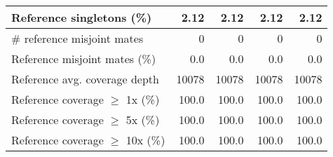 \documentclass[12pt,a4paper]{article}
\begin{document}
\begin{table}[ht]
\begin{center}
\begin{tabular}{|l*{4}{|r}|}
Reference singletons (\%) & 2.12 & 2.12 & 2.12 & 2.12 \\ \hline
\# reference misjoint mates & 0 & 0 & 0 & 0 \\ \hline
Reference misjoint mates (\%) & 0.0 & 0.0 & 0.0 & 0.0 \\ \hline
Reference avg. coverage depth & 10078 & 10078 & 10078 & 10078 \\ \hline
Reference coverage $\geq$ 1x (\%) & 100.0 & 100.0 & 100.0 & 100.0 \\ \hline
Reference coverage $\geq$ 5x (\%) & 100.0 & 100.0 & 100.0 & 100.0 \\ \hline
Reference coverage $\geq$ 10x (\%) & 100.0 & 100.0 & 100.0 & 100.0 \\ \hline
\end{tabular}
\end{center}
\end{table}
\end{document}
